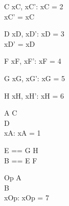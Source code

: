 \begin{schema}{C}
xC, xC': \nat
\where
xC = 2 \\
xC' = xC
\end{schema}

\begin{schema}{D}
xD, xD': \nat
\where
xD = 3 \\
xD' = xD
\end{schema}

\begin{schema}{F}
xF, xF': \nat
\where
xF = 4
\end{schema}

\begin{schema}{G}
xG, xG': \nat
\where
xG = 5
\end{schema}

\begin{schema}{H}
xH, xH': \nat
\where
xH = 6
\end{schema}


\begin{schema}{A}
C \\
D \\
xA: \nat
\where 
xA = 1
\end{schema}


\begin{zed}
E == G \land H \\
B == E \lor F
\end{zed}


\begin{schema}{Op}
A \\
B \\
xOp: \nat
\where
xOp = 7
\end{schema}

